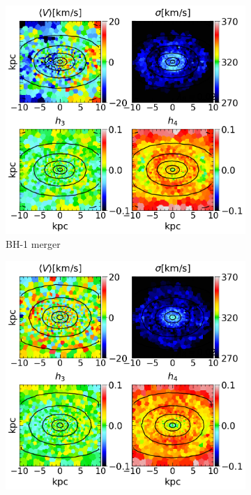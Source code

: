 \documentclass[english, twoside]{HYgradu}
\begin{document}
\begin{figure}
	\centering
	\begin{subfigure}[b]{0.49\textwidth}
		\includegraphics[width=\textwidth]{BH_1.png}
		\caption{BH-1 merger}
	\end{subfigure}
	\begin{subfigure}[b]{0.49\textwidth}
		\includegraphics[width=\textwidth]{BH_2.png}

\end{subfigure}
\end{figure}
\end{document}
